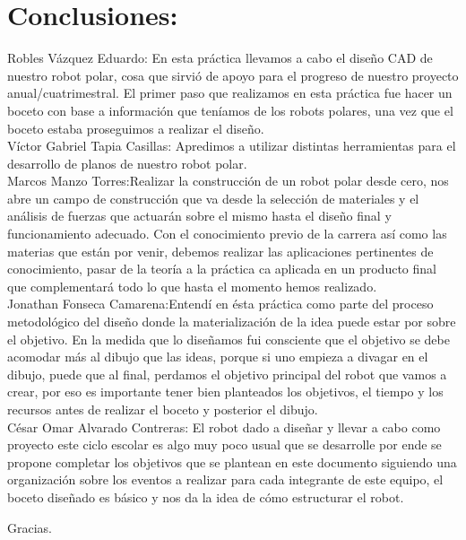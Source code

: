 \documentclass[12pt,a4paper]{report}
\begin{document}
\section{Conclusiones:}
Robles Vázquez Eduardo:
En esta práctica llevamos a cabo el diseño CAD de nuestro robot polar, cosa que sirvió de apoyo para el progreso de nuestro proyecto anual/cuatrimestral. El primer paso que realizamos en esta práctica fue hacer un boceto con base a información que teníamos de los robots polares, una vez que el boceto estaba proseguimos a realizar el diseño.\\

Víctor Gabriel Tapia Casillas: Apredimos a utilizar distintas herramientas para el desarrollo de planos de nuestro robot polar.\\

Marcos Manzo Torres:Realizar la construcción de un robot polar desde cero, nos abre un campo de construcción que va desde la selección de materiales y el análisis de fuerzas que actuarán sobre el mismo hasta el diseño final y funcionamiento adecuado. Con el conocimiento previo de la carrera así como las materias que están por venir, debemos realizar las aplicaciones pertinentes de conocimiento, pasar de la teoría a la práctica ca aplicada en un producto final que complementará todo lo que hasta el momento hemos realizado.\\

Jonathan Fonseca Camarena:Entendí en ésta práctica como parte del proceso metodológico del diseño donde la materialización de la idea puede estar por sobre el objetivo. En la medida que lo diseñamos fui consciente que el objetivo se debe acomodar más al dibujo que las ideas, porque si uno empieza a divagar en el dibujo, puede que al final, perdamos el objetivo principal del robot que vamos a crear, por eso es importante tener bien planteados los objetivos, el tiempo y los recursos antes de realizar el boceto y posterior el dibujo.\\

César Omar Alvarado Contreras: El robot dado a diseñar y llevar a cabo como proyecto este ciclo escolar es algo muy poco usual que se desarrolle por ende se propone completar los objetivos que se plantean en este documento siguiendo una organización sobre los eventos a realizar para cada integrante de este equipo, el boceto diseñado es básico y nos da la idea de cómo estructurar el robot.

\begin{center}
Gracias.
\end{center}
\end{document}

